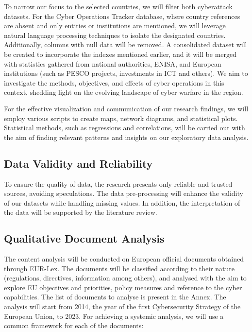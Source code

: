 To narrow our focus to the selected countries, we will filter both cyberattack datasets. For the Cyber Operations Tracker database, where country references are absent and only entities or institutions are mentioned, we will leverage natural language processing techniques to isolate the designated countries. Additionally, columns with null data will be removed. A consolidated dataset will be created to incorporate the indexes mentioned earlier, and it will be merged with statistics gathered from national authorities, ENISA, and European institutions (such as PESCO projects, investments in ICT and others). We aim to investigate the methods, objectives, and effects of cyber operations in this context, shedding light on the evolving landscape of cyber warfare in the region.

For the effective visualization and communication of our research findings, we will employ various scripts to create maps, network diagrams, and statistical plots. Statistical methods, such as regressions and correlations, will be carried out with the aim of finding relevant patterns and insights on our exploratory data analysis.


\subsection{Data Validity and Reliability}

To ensure the quality of data, the research presents only reliable and trusted sources, avoiding speculations. The data pre-processing will enhance the validity of our datasets while handling missing values. In addition, the interpretation of the data will be supported by the literature review. 

\subsection{Qualitative Document Analysis}

The content analysis will be conducted on European official documents obtained through EUR-Lex. The documents will be classified according to their nature (regulations, directives, information among others), and analysed with the aim to explore EU objectives and priorities, policy measures and reference to the cyber capabilities. 
The list of documents to analyse is present in the Annex. The analysis will start from 2014, the year of the first Cybersecurity Strategy of the European Union, to 2023. For achieving a systemic analysis, we will use a common framework for each of the documents: 

